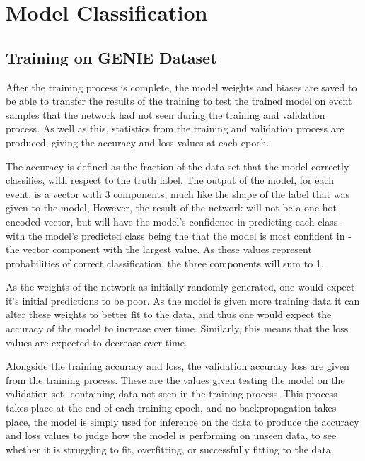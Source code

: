 \onehalfspacing

\section{Model Classification}

\subsection{Training on GENIE Dataset}
\noindent After the training process is complete, the model weights and biases are saved to be able to transfer the results of the training to test the trained model on event samples that the network had not seen during the training and validation process. As well as this, statistics from the training and validation process are produced, giving the accuracy and loss values at each epoch. \medskip

\noindent The accuracy is defined as the fraction of the data set that the model correctly classifies, with respect to the truth label. The output of the model, for each event, is a vector with 3 components, much like the shape of the label that was given to the model, However, the result of the network will not be a one-hot encoded vector, but will have the model's confidence in predicting each class- with the model's predicted class being the that the model is most confident in - the vector component with the largest value. As these values represent probabilities of correct classification, the three components will sum to 1.\medskip

\noindent As the weights of the network as initially randomly generated, one would expect it's initial predictions to be poor. As the model is given more training data it can alter these weights to better fit to the data, and thus one would expect the accuracy of the model to increase over time. Similarly, this means that the loss values are expected to decrease over time.\medskip

\noindent Alongside the training accuracy and loss, the validation accuracy loss are given from the training process. These are the values given testing the model on the validation set- containing data not seen in the training process. This process takes place at the end of each training epoch, and no backpropagation takes place, the model is simply used for inference on the data to produce the accuracy and loss values to judge how the model is performing on unseen data, to see whether it is struggling to fit, overfitting, or successfully fitting to the data. \medskip

